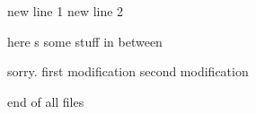 new line 1
new line 2


here s some stuff in between

sorry.
first modification
second modification

end of all files

